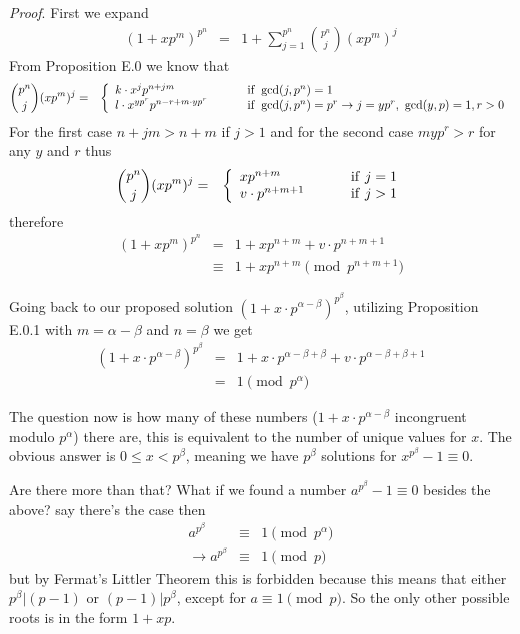 \documentclass[aps,preprint,preprintnumbers,nofootinbib,showpacs,prd]{revtex4-1}
\newcommand{\nbea}{\begin{eqnarray*}}
\newcommand{\neea}{\end{eqnarray*}}
\begin{document}
{\it Proof}. First we expand 
%
\nbea
(1 + xp^m)^{p^n} & = & 1 + \sum_{j=1}^{p^n} \binom{p^n}{j} (xp^m)^j
\neea
%
From Proposition E.0 we know that 
%
\nbea
\binom{p^n}{j} (xp^m)^j & = & \left\{
\begin{array}{l l}
k\cdot x^j p^{n+jm} & ~~~~~~~ {\rm if ~} \gcd(j,p^n) = 1 \\
l\cdot x^{yp^r} p^{n-r + m\cdot yp^r} & ~~~~~~~ {\rm if ~} \gcd(j,p^n) = p^r \to j = yp^r, ~\gcd(y,p) = 1, r > 0
\end{array}\right.
\neea
%
For the first case $n+jm > n+m$ if $j > 1$ and for the second case $myp^r > r$ for any $y$ and $r$ thus
%
\nbea
\binom{p^n}{j} (xp^m)^j & = & \left\{
\begin{array}{l l}
xp^{n+m} & ~~~~~~~ {\rm if ~} j = 1 \\
v\cdot p^{n + m + 1} & ~~~~~~~ {\rm if ~} j > 1
\end{array}\right.
\neea
%
therefore
%
\nbea
(1 + xp^m)^{p^n} & = & 1 + xp^{n+m} + v\cdot p^{n + m + 1} \\
& \equiv & 1 + xp^{n+m} \pmod{p^{n + m + 1}}
\neea
%

Going back to our proposed solution $(1 + x\cdot p^{\alpha-\beta})^{p^\beta}$, utilizing Proposition E.0.1 with $m = \alpha-\beta$ and $n=\beta$ we get
%
\nbea
(1 + x\cdot p^{\alpha-\beta})^{p^\beta} & = & 1 + x\cdot p^{\alpha-\beta +\beta} + v\cdot p^{\alpha-\beta+\beta + 1} \\
& = & 1 \pmod{p^\alpha}
\neea
%


The question now is how many of these numbers ($1 + x\cdot p^{\alpha-\beta}$ incongruent modulo $p^\alpha$) there are, this is equivalent to the number of unique values for $x$. The obvious answer is $0 \le x < p^\beta$, meaning we have $p^\beta$ solutions for $x^{p^\beta} - 1 \equiv 0$.

Are there more than that? What if we found a number $a^{p^\beta} - 1 \equiv 0$ besides the above? say there's the case then
%
\nbea
a^{p^\beta} & \equiv & 1 \pmod{p^\alpha} \\
\to a^{p^\beta} & \equiv & 1 \pmod{p}
\neea
%
but by Fermat's Littler Theorem this is forbidden because this means that either $p^\beta|(p-1)$ or $(p-1)|p^\beta$, except for $a \equiv 1 \pmod{p}$. So the only other possible roots is in the form $1 + xp$.
\end{document}
